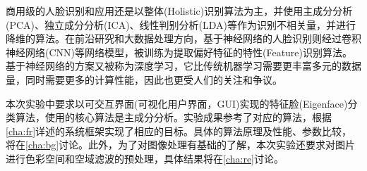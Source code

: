 商用级的人脸识别和应用还是以整体(Holistic)识别算法为主，并使用主成分分析(PCA)、独立成分分析(ICA)、线性判别分析(LDA)等作为识别不相关量，并进行降维的算法。在前沿研究和大数据处理方向，基于神经网络的人脸识别则经过卷积神经网络(CNN)等网络模型，被训练为提取偏好特征的特性(Feature)识别算法。基于神经网络的方案又被称为深度学习，它比传统机器学习需要更丰富多元的数据量，同时需要更多的计算性能，因此也更受人们的关注和争议。\cite{Zhao_2003, Anand_2017}

本次实验中要求以可交互界面(可视化用户界面，GUI)实现的特征脸(Eigenface)分类算法，使用的核心算法是主成分分析。实验成果参考了对应的算法，根据\autoref{cha:fr}详述的系统框架实现了相应的目标。具体的算法原理及性能、参数比较，将在\autoref{cha:bg}讨论。此外，为了对图像处理有基础的了解，本次实验还要求对图片进行色彩空间和空域滤波的预处理，具体结果将在\autoref{cha:re}讨论。








